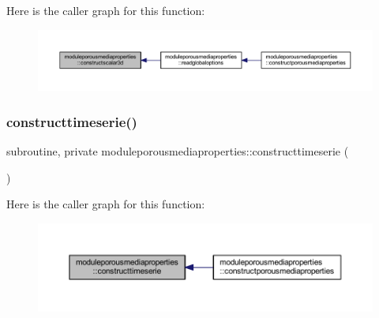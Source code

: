 Here is the caller graph for this function\+:\nopagebreak
\begin{figure}[H]
\begin{center}
\leavevmode
\includegraphics[width=350pt]{namespacemoduleporousmediaproperties_a720c9abb0cbd672dacfd23a18a959f50_icgraph}
\end{center}
\end{figure}
\mbox{\label{namespacemoduleporousmediaproperties_af8b1e7f8c04441c79ef987887896d90a}} 
\subsubsection{\texorpdfstring{constructtimeserie()}{constructtimeserie()}}
{\footnotesize\ttfamily subroutine, private moduleporousmediaproperties\+::constructtimeserie (\begin{DoxyParamCaption}{ }\end{DoxyParamCaption})\hspace{0.3cm}{\ttfamily [private]}}

Here is the caller graph for this function\+:\nopagebreak
\begin{figure}[H]
\begin{center}
\leavevmode
\includegraphics[width=350pt]{namespacemoduleporousmediaproperties_af8b1e7f8c04441c79ef987887896d90a_icgraph}
\end{center}
\end{figure}
\mbox{\label{namespacemoduleporousmediaproperties_a2d7950fe81dbe3ec4b45b30ce9e19e5c}} 
